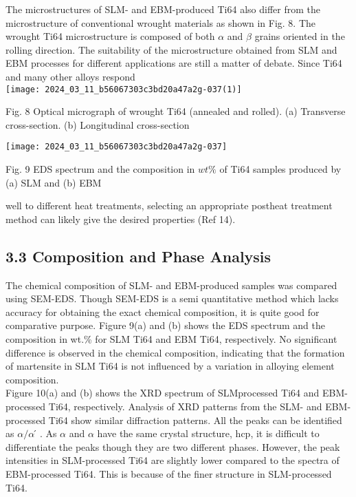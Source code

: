 \documentclass[10pt]{article}
\begin{document}
The microstructures of SLM- and EBM-produced Ti64 also differ from the microstructure of conventional wrought materials as shown in Fig. 8. The wrought Ti64 microstructure is composed of both $\alpha$ and $\beta$ grains oriented in the rolling direction. The suitability of the microstructure obtained from SLM and EBM processes for different applications are still a matter of debate. Since Ti64 and many other alloys respond\\
\texttt{[image: 2024\_03\_11\_b56067303c3bd20a47a2g-037(1)]}

Fig. 8 Optical micrograph of wrought Ti64 (annealed and rolled). (a) Transverse cross-section. (b) Longitudinal cross-section

\begin{center}
\texttt{[image: 2024\_03\_11\_b56067303c3bd20a47a2g-037]}
\end{center}

Fig. 9 EDS spectrum and the composition in $w t \%$ of Ti64 samples produced by (a) SLM and (b) EBM

well to different heat treatments, selecting an appropriate postheat treatment method can likely give the desired properties (Ref 14).

\subsection*{3.3 Composition and Phase Analysis}
The chemical composition of SLM- and EBM-produced samples was compared using SEM-EDS. Though SEM-EDS is a semi quantitative method which lacks accuracy for obtaining the exact chemical composition, it is quite good for comparative purpose. Figure 9(a) and (b) shows the EDS spectrum and the composition in wt.\% for SLM Ti64 and EBM Ti64, respectively. No significant difference is observed in the chemical composition, indicating that the formation of martensite in SLM Ti64 is not influenced by a variation in alloying element composition.\\
Figure 10(a) and (b) shows the XRD spectrum of SLMprocessed Ti64 and EBM-processed Ti64, respectively. Analysis of XRD patterns from the SLM- and EBM-processed Ti64 show similar diffraction patterns. All the peaks can be identified as $\alpha / \alpha ́$. As $\alpha$ and $\alpha$ have the same crystal structure, hcp, it is difficult to differentiate the peaks though they are two different phases. However, the peak intensities in SLM-processed Ti64 are slightly lower compared to the spectra of EBM-processed Ti64. This is because of the finer structure in SLM-processed Ti64.
\end{document}

